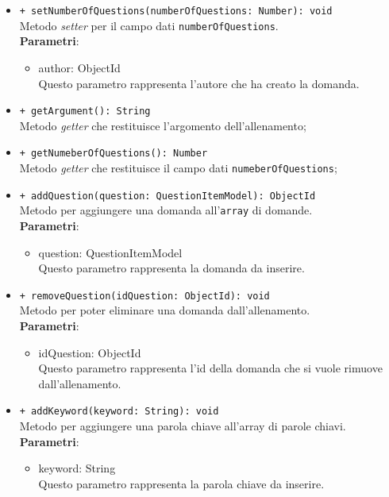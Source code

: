 \begin{itemize}
\begin{itemize}
				\item \texttt{+ setNumberOfQuestions(numberOfQuestions: Number): void} \\
				Metodo \textit{setter} per il campo dati \texttt{numberOfQuestions}.\\
				\textbf{Parametri}:
				\begin{itemize}
					\item {author: ObjectId}\\
					Questo parametro rappresenta l'autore che ha creato la domanda.
				\end{itemize}
				
				\item \texttt{+ getArgument(): String} \\
				Metodo \textit{getter} che restituisce l'argomento dell'allenamento;
				
				\item \texttt{+ getNumeberOfQuestions(): Number} \\
				Metodo \textit{getter} che restituisce il campo dati \texttt{numeberOfQuestions};
				
				\item \texttt{+ addQuestion(question: QuestionItemModel): ObjectId} \\
				Metodo per aggiungere una domanda all'\texttt{array} di domande.\\
				\textbf{Parametri}:
				\begin{itemize}
					\item {question: QuestionItemModel}\\
					Questo parametro rappresenta la domanda da inserire.
				\end{itemize}
				
				\item \texttt{+ removeQuestion(idQuestion: ObjectId): void} \\
				Metodo per poter eliminare una domanda dall'allenamento.\\
				\textbf{Parametri}:
				\begin{itemize}
					\item {idQuestion: ObjectId}\\
					Questo parametro rappresenta l'id della domanda che si vuole rimuove dall'allenamento.
				\end{itemize}
				
				\item \texttt{+ addKeyword(keyword: String): void} \\
				Metodo per aggiungere una parola chiave all'array di parole chiavi.\\
				\textbf{Parametri}:
				\begin{itemize}
					\item {keyword: String}\\
					Questo parametro rappresenta la parola chiave da inserire.
				\end{itemize}
				

\end{itemize}
\end{itemize}
